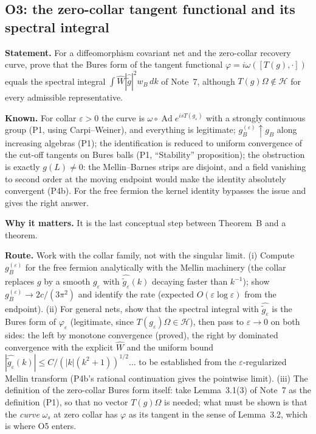 \documentclass[11pt]{article}
\theoremstyle{accent}
\theoremstyle{definition}
\newcommand{\Ad}{\operatorname{Ad}}
\newcommand{\eps}{\varepsilon}
\begin{document}
\subsection{O3: the zero-collar tangent functional and its spectral integral}\label{sec:O3}
\textbf{Statement.} For a diffeomorphism covariant net and the zero-collar recovery curve, prove that the Bures form of the tangent functional \(\varphi=i\omega([T(g),\cdot])\) equals the spectral integral \(\int\widehat W|\widehat{\widetilde g}|^2w_B\,dk\) of Note~7, although \(T(g)\Omega\notin\mathcal H\) for every admissible representative.

\textbf{Known.} For collar \(\eps>0\) the curve is \(\omega\circ\Ad e^{isT(g_\eps)}\) with a strongly continuous group (P1, using Carpi--Weiner), and everything is legitimate; \(g_B^{(\eps)}\uparrow g_B\) along increasing algebras (P1); the identification is reduced to uniform convergence of the cut-off tangents on Bures balls (P1, ``Stability'' proposition); the obstruction is exactly \(g(L)\neq0\): the Mellin--Barnes strips are disjoint, and a field vanishing to second order at the moving endpoint would make the identity absolutely convergent (P4b).  For the free fermion the kernel identity bypasses the issue and gives the right answer.

\textbf{Why it matters.} It is the last conceptual step between Theorem~B and a theorem.

\textbf{Route.} Work with the collar family, not with the singular limit.  (i) Compute \(g_B^{(\eps)}\) for the free fermion analytically with the Mellin machinery (the collar replaces \(g\) by a smooth \(g_\eps\) with \(\widehat{\widetilde g_\eps}(k)\) decaying faster than \(k^{-1}\)); show \(g_B^{(\eps)}\to2c/(3\pi^2)\) and identify the rate (expected \(O(\eps\log\eps)\) from the endpoint).  (ii) For general nets, show that the spectral integral with \(\widehat{\widetilde g_\eps}\) is the Bures form of \(\varphi_\eps\) (legitimate, since \(T(g_\eps)\Omega\in\mathcal H\)), then pass to \(\eps\to0\) on both sides: the left by monotone convergence (proved), the right by dominated convergence with the explicit \(\widehat W\) and the uniform bound \(|\widehat{\widetilde g_\eps}(k)|\le C/(|k|(k^2+1))^{1/2}\dots\) to be established from the \(\eps\)-regularized Mellin transform (P4b's rational continuation gives the pointwise limit).  (iii) The definition of the zero-collar Bures form itself: take Lemma~3.1(3) of Note~7 as the definition (P1), so that no vector \(T(g)\Omega\) is needed; what must be shown is that the \emph{curve} \(\omega_s\) at zero collar has \(\varphi\) as its tangent in the sense of Lemma~3.2, which is where O5 enters.
\end{document}
